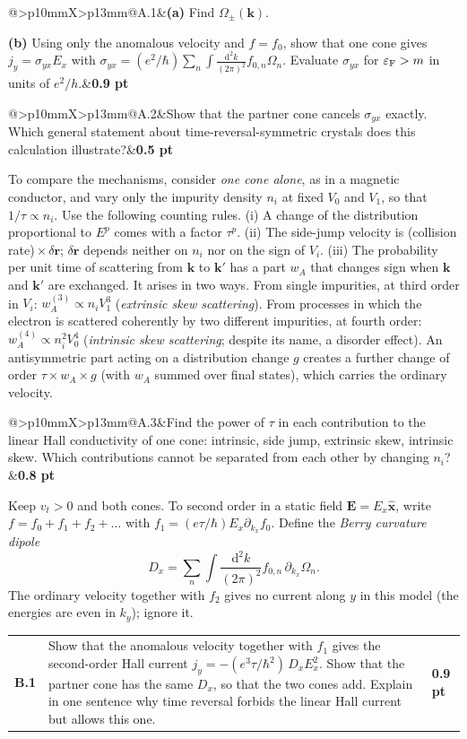 \documentclass[11pt,a4paper]{article}
\makeatletter
\newcommand{\dd}{\mathrm d}
\newcommand{\eF}{\varepsilon_{\rm F}}
\newcommand{\parttitle}[3]{\par\Needspace{8\baselineskip}\vspace{6pt}{\large\bfseries\color{ink}Part #1. #2\hfill\normalsize(#3 points)}\par\vspace{2pt}}
\newcommand{\question}[3]{\begin{tcolorbox}[enhanced,colback=white,colframe=rulegray,boxrule=0.5pt,arc=0pt,left=7pt,right=7pt,top=7pt,bottom=7pt,before skip=9pt,after skip=9pt]\begin{tabularx}{\linewidth}{@{}>{\bfseries}p{10mm}X>{\raggedleft\arraybackslash}p{13mm}@{}}#1&#3&\textbf{#2 pt}\end{tabularx}\end{tcolorbox}}
\makeatother
\begin{document}
\question{A.1}{0.9}{\textbf{(a)} Find $\Omega_\pm(\bm k)$.\par
\textbf{(b)} Using only the anomalous velocity and $f=f_0$, show that one cone gives $j_y=\sigma_{yx}E_x$ with $\sigma_{yx}=(e^2/\hbar)\sum_n\int\frac{\dd^2k}{(2\pi)^2}f_{0,n}\Omega_n$. Evaluate $\sigma_{yx}$ for $\eF>m$ in units of $e^2/h$.}

\question{A.2}{0.5}{Show that the partner cone cancels $\sigma_{yx}$ exactly. Which general statement about time-reversal-symmetric crystals does this calculation illustrate?}

To compare the mechanisms, consider \emph{one cone alone}, as in a magnetic conductor, and vary only the impurity density $n_i$ at fixed $V_0$ and $V_1$, so that $1/\tau\propto n_i$. Use the following counting rules.
(i) A change of the distribution proportional to $E^p$ comes with a factor $\tau^p$.
(ii) The side-jump velocity is (collision rate)\,$\times\,\delta\bm r$; $\delta\bm r$ depends neither on $n_i$ nor on the sign of $V_i$.
(iii) The probability per unit time of scattering from $\bm k$ to $\bm k'$ has a part $w_A$ that changes sign when $\bm k$ and $\bm k'$ are exchanged. It arises in two ways. From single impurities, at third order in $V_i$: $w_A^{(3)}\propto n_iV_1^3$ (\emph{extrinsic skew scattering}). From processes in which the electron is scattered coherently by two different impurities, at fourth order: $w_A^{(4)}\propto n_i^2V_0^4$ (\emph{intrinsic skew scattering}; despite its name, a disorder effect). An antisymmetric part acting on a distribution change $g$ creates a further change of order $\tau\times w_A\times g$ (with $w_A$ summed over final states), which carries the ordinary velocity.

\question{A.3}{0.8}{Find the power of $\tau$ in each contribution to the linear Hall conductivity of one cone: intrinsic, side jump, extrinsic skew, intrinsic skew. Which contributions cannot be separated from each other by changing $n_i$?}

\parttitle{B}{A dipole of curvature}{2.8}
Keep $v_t>0$ and both cones. To second order in a static field $\bm E=E_x\hat{\bm x}$, write $f=f_0+f_1+f_2+\dots$ with $f_1=(e\tau/\hbar)E_x\partial_{k_x}f_0$. Define the \emph{Berry curvature dipole}
\[
D_x=\sum_n\int\frac{\dd^2k}{(2\pi)^2}f_{0,n}\,\partial_{k_x}\Omega_n .
\]
The ordinary velocity together with $f_2$ gives no current along $y$ in this model (the energies are even in $k_y$); ignore it.

\question{B.1}{0.9}{Show that the anomalous velocity together with $f_1$ gives the second-order Hall current $j_y=-(e^3\tau/\hbar^2)\,D_xE_x^2$. Show that the partner cone has the same $D_x$, so that the two cones add. Explain in one sentence why time reversal forbids the linear Hall current but allows this one.}
\end{document}
